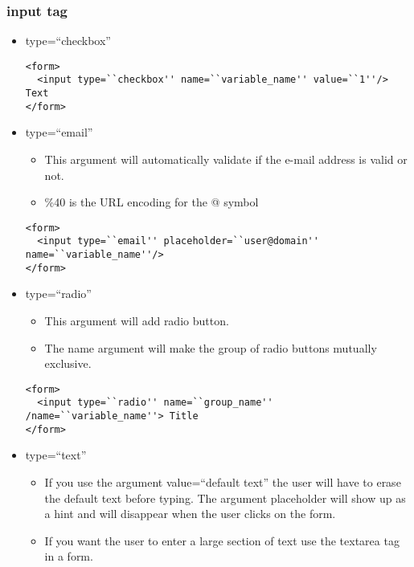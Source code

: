 \documentclass{article}
\begin{document}
\subsubsection{input tag}
\begin{itemize}
  \item type=``checkbox''

\begin{lstlisting}
<form>
  <input type=``checkbox'' name=``variable_name'' value=``1''/> Text
</form>
\end{lstlisting}

  \item type=``email''
    \begin{itemize}
      \item This argument will automatically validate if the e-mail address is
            valid or not.
      \item \%40 is the URL encoding for the @ symbol
    \end{itemize}

\begin{lstlisting}
<form>
  <input type=``email'' placeholder=``user@domain'' name=``variable_name''/>
</form>
\end{lstlisting}

  \item type=``radio''
    \begin{itemize}
      \item This argument will add radio button.
      \item The name argument will make the group of radio buttons mutually
            exclusive.
    \end{itemize}

\begin{lstlisting}
<form>
  <input type=``radio'' name=``group_name'' /name=``variable_name''> Title
</form>
\end{lstlisting}

  \item type=``text''
    \begin{itemize}
      \item If you use the argument value=``default text'' the user will have
            to erase the default text before typing. The argument placeholder
            will show up as a hint and will disappear when the user clicks on
            the form.
      \item If you want the user to enter a large section of text use the
            textarea tag in a form.
    \end{itemize}


\end{itemize}
\end{document}
